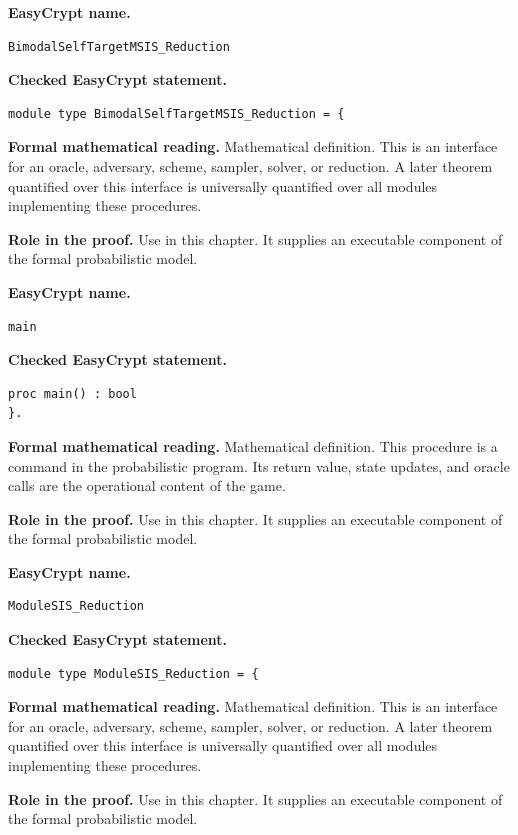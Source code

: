 \begin{formaldefinition}
\noindent\textbf{EasyCrypt name.}
\begin{lstlisting}[language=EasyCrypt,basicstyle=\ttfamily\scriptsize]
BimodalSelfTargetMSIS_Reduction
\end{lstlisting}
\noindent\textbf{Checked EasyCrypt statement.}
\begin{lstlisting}[language=EasyCrypt,basicstyle=\ttfamily\scriptsize]
module type BimodalSelfTargetMSIS_Reduction = {
\end{lstlisting}
\noindent\textbf{Formal mathematical reading.}
Mathematical definition. This is an interface for an oracle, adversary, scheme, sampler, solver, or reduction.  A later theorem quantified over this interface is universally quantified over all modules implementing these procedures.

\noindent\textbf{Role in the proof.}
Use in this chapter. It supplies an executable component of the formal probabilistic model.

\end{formaldefinition}

\begin{formaldefinition}
\noindent\textbf{EasyCrypt name.}
\begin{lstlisting}[language=EasyCrypt,basicstyle=\ttfamily\scriptsize]
main
\end{lstlisting}
\noindent\textbf{Checked EasyCrypt statement.}
\begin{lstlisting}[language=EasyCrypt,basicstyle=\ttfamily\scriptsize]
proc main() : bool
}.
\end{lstlisting}
\noindent\textbf{Formal mathematical reading.}
Mathematical definition. This procedure is a command in the probabilistic program.  Its return value, state updates, and oracle calls are the operational content of the game.

\noindent\textbf{Role in the proof.}
Use in this chapter. It supplies an executable component of the formal probabilistic model.

\end{formaldefinition}

\begin{formaldefinition}
\noindent\textbf{EasyCrypt name.}
\begin{lstlisting}[language=EasyCrypt,basicstyle=\ttfamily\scriptsize]
ModuleSIS_Reduction
\end{lstlisting}
\noindent\textbf{Checked EasyCrypt statement.}
\begin{lstlisting}[language=EasyCrypt,basicstyle=\ttfamily\scriptsize]
module type ModuleSIS_Reduction = {
\end{lstlisting}
\noindent\textbf{Formal mathematical reading.}
Mathematical definition. This is an interface for an oracle, adversary, scheme, sampler, solver, or reduction.  A later theorem quantified over this interface is universally quantified over all modules implementing these procedures.

\noindent\textbf{Role in the proof.}
Use in this chapter. It supplies an executable component of the formal probabilistic model.

\end{formaldefinition}

